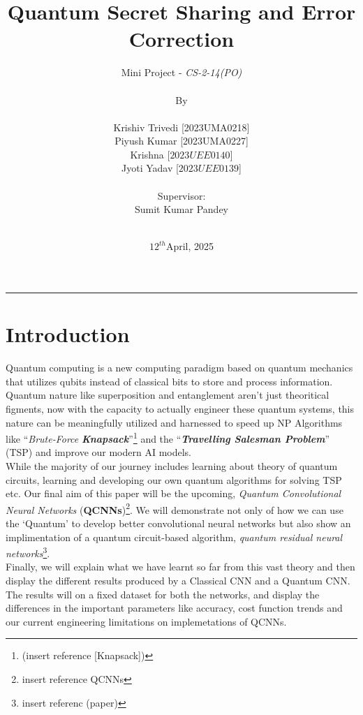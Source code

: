 \documentclass[a4paper]{article}
\title{Quantum Secret Sharing and Error Correction}
\author{
Mini Project - \emph{CS-2-14(PO)}  \\\\  \small{By} \\\\  Krishiv Trivedi\hspace{0.2cm} [2023UMA0218] \\ Piyush Kumar \hspace{0.193cm} [2023UMA0227] \\ Krishna \hspace{1.58cm}[$2023UEE0140$] \\ Jyoti Yadav \hspace{0.86cm}[$2023UEE0139$] \\\\ \small{Supervisor:} \\ Sumit Kumar Pandey \\ \hspace{0.94cm}\\
}
\date{$12^{th}$April, 2025}
\begin{document}
\maketitle
\hrule
\section*{Introduction}
Quantum computing is a new computing paradigm based on quantum
mechanics that utilizes qubits instead of classical bits to store and process
information. Quantum nature like superposition and entanglement aren't just theoritical figments, now with the capacity to actually engineer these quantum systems, this nature can be meaningfully utilized and harnessed to speed up NP Algorithms like ``\emph{Brute-Force} \emph{\textbf{Knapsack}}''\footnote{(insert reference [Knapsack])} and the ``\emph{\textbf{Travelling Salesman Problem}}'' (TSP) and improve our modern AI models.\\

 While the majority of our journey includes learning about theory of quantum circuits, learning and developing our own quantum algorithms for solving TSP etc. Our final aim of this paper will be the upcoming, \emph{Quantum Convolutional Neural Networks} (\textbf{QCNNs})\footnote{insert reference QCNNs}. We will demonstrate not only of how we can use the `Quantum' to develop better convolutional neural networks but also show an implimentation of a quantum circuit-based algorithm, \emph{quantum residual neural networks}\footnote{insert referenc (paper)}.\\

Finally, we will explain what we have learnt so far from this vast theory and then display the different results produced by a Classical CNN and a Quantum CNN. The results will on a fixed dataset for both the networks, and display the differences in the important parameters like accuracy, cost function trends and our current engineering limitations on implemetations of QCNNs.
\end{document}
